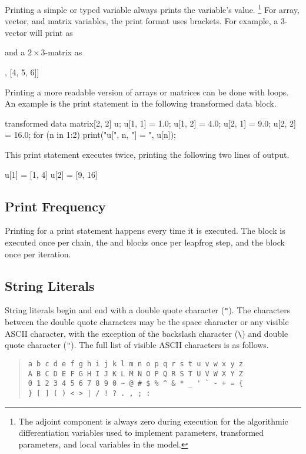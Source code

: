 Printing a simple  or  typed variable always
prints the variable's value.%
%
\footnote{The adjoint component is always zero during execution for
  the algorithmic differentiation variables used to implement
  parameters, transformed parameters, and local variables in the model.}
%
For array, vector, and matrix variables, the print format uses
brackets.  For example, a 3-vector will print as
%
\begin{stancode}
[1, 2, 3]
\end{stancode}
%
and a $2 \times 3$-matrix as
%
\begin{stancode}
[[1, 2, 3], [4, 5, 6]]
\end{stancode}
%

Printing a more readable version of arrays or matrices can be done
with loops.  An example is the print statement in the following
transformed data block.
%
\begin{stancode}
transformed data {
  matrix[2, 2] u;
  u[1, 1] = 1.0;   u[1, 2] = 4.0;
  u[2, 1] = 9.0;   u[2, 2] = 16.0;
  for (n in 1:2)
    print("u[", n, "] = ", u[n]);
}
\end{stancode}
%
This print statement executes twice, printing the following two lines
of output.
%
\begin{stancode}
u[1] = [1, 4]
u[2] = [9, 16]
\end{stancode}



\subsection{Print Frequency}

Printing for a print statement happens every time it is executed.  The
 block is executed once per chain, the
 and  blocks once per leapfrog
step, and the  block once per iteration.

\subsection{String Literals}

String literals begin and end with a double quote character
(\Verb|"|).  The characters between the double quote characters may be
the space character or any visible ASCII character, with the exception
of the backslash character (\Verb|\|) and double quote character
(\Verb|"|).  The full list of visible ASCII characters is as follows.
%
\begin{quote}
\begin{Verbatim}
a b c d e f g h i j k l m n o p q r s t u v w x y z
A B C D E F G H I J K L M N O P Q R S T U V W X Y Z
0 1 2 3 4 5 6 7 8 9 0 ~ @ # $ % ^ & * _ ' ` - + = {
} [ ] ( ) < > | / ! ? . , ; :
\end{Verbatim}
\end{quote}

